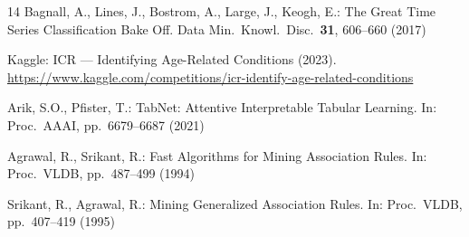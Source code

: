 \documentclass[runningheads]{llncs}
\begin{document}
\begin{thebibliography}{14}
Bagnall, A., Lines, J., Bostrom, A., Large, J., Keogh, E.: The Great Time Series Classification Bake Off. Data Min.\ Knowl.\ Disc.\ \textbf{31}, 606--660 (2017)

Kaggle: ICR --- Identifying Age-Related Conditions (2023). \url{https://www.kaggle.com/competitions/icr-identify-age-related-conditions}

Arik, S.O., Pfister, T.: TabNet: Attentive Interpretable Tabular Learning. In: Proc.\ AAAI, pp.\ 6679--6687 (2021)

Agrawal, R., Srikant, R.: Fast Algorithms for Mining Association Rules. In: Proc.\ VLDB, pp.\ 487--499 (1994)

Srikant, R., Agrawal, R.: Mining Generalized Association Rules. In: Proc.\ VLDB, pp.\ 407--419 (1995)

\end{thebibliography}
\end{document}

